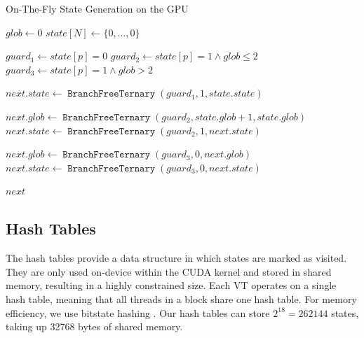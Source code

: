 \documentclass[
fancyheadings, %
%
%
]{stsreprt}
\DeclareMathOperator{\sSuccessor}{\texttt{state\_successor}}
\DeclareMathOperator{\branchFreeTernary}{\texttt{BranchFreeTernary}}
\begin{document}

\begin{algorithm}
    \caption{On-The-Fly State Generation on the GPU}
    \label{alg:on-the-fly-state-generation-on-the-gpu}
    \begin{algorithmic}
        \State $glob \gets 0$
        \State $state[N] \gets \{0, \dots, 0\}$

        \Statex

        \Function{$\sSuccessor$}{p, ndc, state}
        \State $guard_1 \gets state[p] = 0$
        \State $guard_2 \gets state[p] = 1 \land glob \leq 2$
        \State $guard_3 \gets state[p] = 1 \land glob > 2$

        \State $next.state \gets \branchFreeTernary(guard_1, 1, state.state)$

        \State $next.glob \gets \branchFreeTernary(guard_2, state.glob + 1, state.glob)$
        \State $next.state \gets \branchFreeTernary(guard_2, 1, next.state)$

        \State $next.glob \gets \branchFreeTernary(guard_3, 0, next.glob)$
        \State $next.state \gets \branchFreeTernary(guard_3, 0, next.state)$

        \Statex

        \State \Return $next$
        \EndFunction
    \end{algorithmic}
\end{algorithm}


\subsection{Hash Tables}
\label{section:implementation:hash-tables}

The hash tables provide a data structure in which states are marked as visited.
They are only used on-device within the CUDA kernel and stored in shared memory, resulting in a highly constrained size.
Each VT operates on a single hash table, meaning that all threads in a block share one hash table.
For memory efficiency, we use bitstate hashing \cite{DeFrancisco2020.Grapple}.
Our hash tables can store $2^{18}=\num{262144}$ states, taking up \num{32768} bytes of shared memory.
\end{document}
